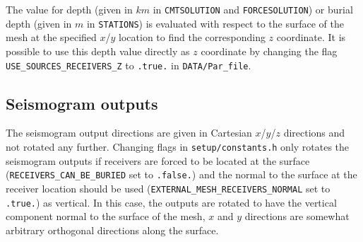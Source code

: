 The value for depth (given in $km$ in \texttt{CMTSOLUTION} and \texttt{FORCESOLUTION})
or burial depth (given in $m$ in \texttt{STATIONS}) is evaluated
with respect to the surface of the mesh at the specified $x$/$y$
location to find the corresponding $z$ coordinate. It is possible
to use this depth value directly as $z$ coordinate by changing the
flag \texttt{USE\_SOURCES\_RECEIVERS\_Z} to \texttt{.true.} in
\texttt{DATA/Par\_file}.


\subsection*{Seismogram outputs}

The seismogram output directions are given in Cartesian $x$/$y$/$z$
directions and not rotated any further. Changing flags in \texttt{setup/constants.h} only rotates the seismogram
outputs if receivers are forced to be located at the surface (\texttt{RECEIVERS\_CAN\_BE\_BURIED}
set to \texttt{.false.}) and the normal to the surface at the receiver
location should be used (\texttt{EXTERNAL\_MESH\_RECEIVERS\_NORMAL} set to \texttt{.true.})
as vertical. In this case, the outputs are rotated to have the vertical
component normal to the surface of the mesh, $x$ and $y$ directions
are somewhat arbitrary orthogonal directions along the surface.

